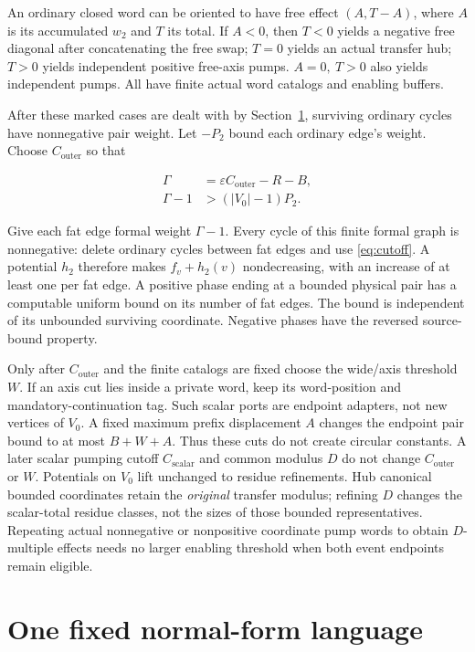 \documentclass[11pt,a4paper]{article}
\theoremstyle{remark}
\newcommand{\Co}{C_{\mathrm{outer}}}
\newcommand{\Cs}{C_{\mathrm{scalar}}}
\begin{document}
An ordinary closed word can be oriented to have free effect \((A,T-A)\), where \(A\) is its accumulated \(w_2\) and \(T\) its total. If \(A<0\), then \(T<0\) yields a negative free diagonal after concatenating the free swap; \(T=0\) yields an actual transfer hub; \(T>0\) yields independent positive free-axis pumps. \(A=0,\ T>0\) also yields independent pumps. All have finite actual word catalogs and enabling buffers.

After these marked cases are dealt with by Section~\ref{sec:normal}, surviving ordinary cycles have nonnegative pair weight. Let \(-P_2\) bound each ordinary edge's weight. Choose \(\Co\) so that

\begin{equation}
\begin{aligned}\Gamma&=\varepsilon\Co-R-B,\\ \Gamma-1&>(|V_0|-1)P_2.\end{aligned}\label{eq:cutoff}
\end{equation}


Give each fat edge formal weight \(\Gamma-1\). Every cycle of this finite formal graph is nonnegative: delete ordinary cycles between fat edges and use \eqref{eq:cutoff}. A potential \(h_2\) therefore makes \(f_v+h_2(v)\) nondecreasing, with an increase of at least one per fat edge. A positive phase ending at a bounded physical pair has a computable uniform bound on its number of fat edges. The bound is independent of its unbounded surviving coordinate. Negative phases have the reversed source-bound property.

Only after \(\Co\) and the finite catalogs are fixed choose the wide/axis threshold \(W\). If an axis cut lies inside a private word, keep its word-position and mandatory-continuation tag. Such scalar ports are endpoint adapters, not new vertices of \(V_0\). A fixed maximum prefix displacement \(A\) changes the endpoint pair bound to at most \(B+W+A\). Thus these cuts do not create circular constants. A later scalar pumping cutoff \(\Cs\) and common modulus \(D\) do not change \(\Co\) or \(W\). Potentials on \(V_0\) lift unchanged to residue refinements. Hub canonical bounded coordinates retain the \emph{original} transfer modulus; refining \(D\) changes the scalar-total residue classes, not the sizes of those bounded representatives. Repeating actual nonnegative or nonpositive coordinate pump words to obtain \(D\)-multiple effects needs no larger enabling threshold when both event endpoints remain eligible.

\section{One fixed normal-form language}\label{sec:normal}
\end{document}
